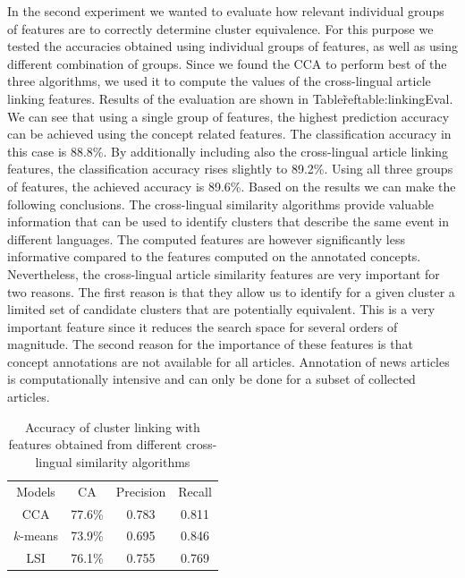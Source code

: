 \documentclass[twoside,11pt]{article}
\begin{document}
In the second experiment we wanted to evaluate how relevant individual groups of features are to correctly determine cluster equivalence. For this purpose we tested the accuracies obtained using individual groups of features, as well as using different combination of groups. Since we found the CCA to perform best of the three algorithms, we used it to compute the values of the cross-lingual article linking features. Results of the evaluation are shown in Table\~ref{table:linkingEval}. We can see that using a single group of features, the highest prediction accuracy can be achieved using the concept related features. The classification accuracy in this case is 88.8\%. By additionally including also the cross-lingual article linking features, the classification accuracy rises slightly to 89.2\%. Using all three groups of features, the achieved accuracy is 89.6\%.
Based on the results we can make the following conclusions. The cross-lingual similarity algorithms provide valuable information that can be used to identify clusters that describe the same event in different languages. The computed features are however significantly less informative compared to the features computed on the annotated concepts. Nevertheless, the cross-lingual article similarity features are very important for two reasons. The first reason is that they allow us to identify for a given cluster a limited set of candidate clusters that are potentially equivalent. This is a very important feature since it reduces the search space for several orders of magnitude. The second reason for the importance of these features is that concept annotations are not available for all articles. Annotation of news articles is computationally intensive and can only be done for a subset of collected articles.

\begin{table}[h]
\caption{Accuracy of cluster linking with features obtained from different cross-lingual similarity algorithms}
\label{table:linkingEvalAlgos}
\begin{center}
\begin{tabular}{|c|c|c|c|}
  \hline
  \cline{1-4}
  Models & CA & Precision & Recall \\ \cline{1-4}
  CCA & 77.6\% & 0.783 & 0.811 \\ \cline{1-4}
  $k$-means & 73.9\% & 0.695 & 0.846 \\ \cline{1-4}
  LSI & 76.1\% & 0.755 & 0.769 \\ \cline{1-4}
  \hline
\end{tabular}
\end{center}
\end{table}
\end{document}
